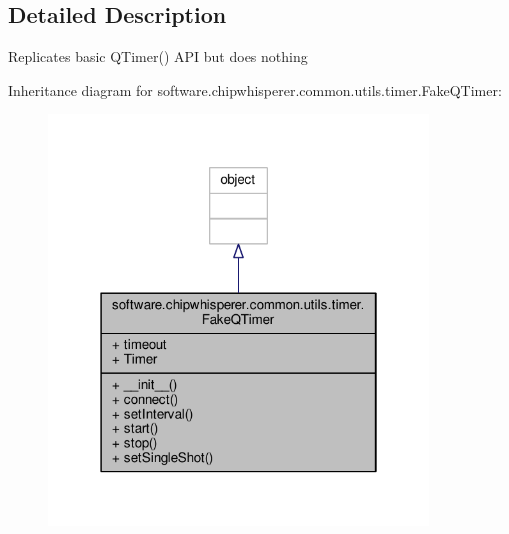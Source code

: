 \subsection{Detailed Description}
\begin{DoxyVerb}Replicates basic QTimer() API but does nothing \end{DoxyVerb}
 

Inheritance diagram for software.\+chipwhisperer.\+common.\+utils.\+timer.\+Fake\+Q\+Timer\+:\nopagebreak
\begin{figure}[H]
\begin{center}
\leavevmode
\includegraphics[width=286pt]{d8/dfc/classsoftware_1_1chipwhisperer_1_1common_1_1utils_1_1timer_1_1FakeQTimer__inherit__graph}
\end{center}
\end{figure}


